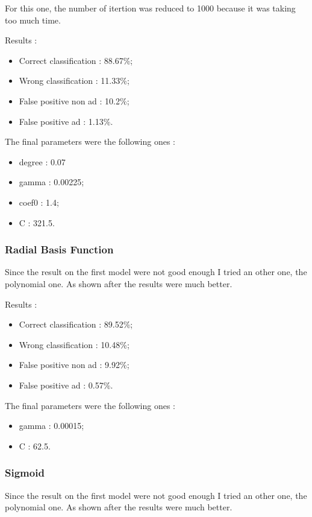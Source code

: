 For this one, the number of itertion was reduced to 1000 because it was taking too much time.

Results :
\begin{itemize}
  \item Correct classification : 88.67\%;
  \item Wrong classification : 11.33\%;
  \item False positive non ad : 10.2\%;
  \item False positive ad : 1.13\%.
\end{itemize}

The final parameters were the following ones :
\begin{itemize}
  \item degree : 0.07
  \item gamma : 0.00225;
  \item coef0 : 1.4;
  \item C : 321.5.
\end{itemize}

\subsubsection{Radial Basis Function}

Since the result on the first model were not good enough I tried an other one, the polynomial one. As shown after the results were much better.

Results :
\begin{itemize}
  \item Correct classification : 89.52\%;
  \item Wrong classification : 10.48\%;
  \item False positive non ad : 9.92\%;
  \item False positive ad : 0.57\%.
\end{itemize}

The final parameters were the following ones :
\begin{itemize}
  \item gamma : 0.00015;
  \item C : 62.5.
\end{itemize}

\subsubsection{Sigmoid}

Since the result on the first model were not good enough I tried an other one, the polynomial one. As shown after the results were much better.

